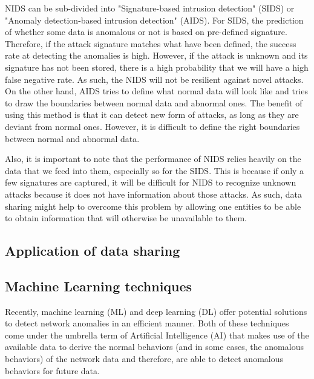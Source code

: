 \begin{background}
NIDS can be sub-divided into "Signature-based intrusion detection" (SIDS) or "Anomaly detection-based intrusion detection" (AIDS). For SIDS, the prediction of whether some data is anomalous or not is based on pre-defined signature. Therefore, if the attack signature matches what have been defined, the success rate at detecting the anomalies is high. However, if the attack is unknown and its signature has not been stored, there is a high probability that we will have a high false negative rate. As such, the NIDS will not be resilient against novel attacks. On the other hand, AIDS tries to define what normal data will look like and tries to draw the boundaries between normal data and abnormal ones. The benefit of using this method is that it can detect new form of attacks, as long as they are deviant from normal ones. However, it is difficult to define the right boundaries between normal and abnormal data.

Also, it is important to note that the performance of NIDS relies heavily on the data that we feed into them, especially so for the SIDS. This is because if only a few signatures are captured, it will be difficult for NIDS to recognize unknown attacks because it does not have information about those attacks. As such, data sharing might help to overcome this problem by allowing one entities to be able to obtain information that will otherwise be unavailable to them.


\subsection{Application of data sharing}

\subsection{Machine Learning techniques} 
Recently, machine learning (ML) and deep learning (DL) offer potential solutions to detect network anomalies in an efficient manner. Both of these techniques come under the umbrella term of Artificial Intelligence (AI) that makes use of the available data to derive the normal behaviors (and in some cases, the anomalous behaviors) of the network data and therefore, are able to detect anomalous behaviors for future data. 


\end{background}
